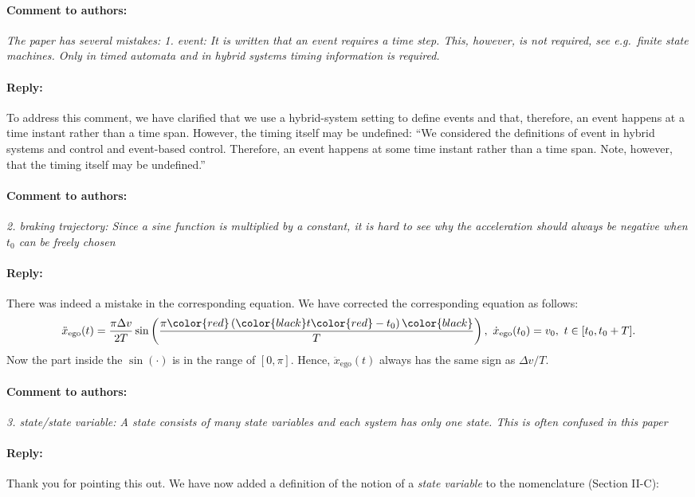 \documentclass[10pt,final,a4paper,oneside,onecolumn]{article}
\newcommand{\toauthor}{\paragraph*{Comment to authors:} \itshape}
\newcommand{\fromauthor}{\paragraph*{Reply:} \normalfont}
\newcommand{\cstart}{\cbstart\color{red}}
\newcommand{\cend}{\cbend\color{black}}
\newcommand{\amplitude}{\Delta v}
\newcommand{\duration}{T}
\newcommand{\east}{x}
\newcommand{\egosub}{ego}
\newcommand{\egospeed}{\dot{\east}_{\mathrm{\egosub}}}
\newcommand{\egospeedinitsymbol}{v}
\newcommand{\egospeedinit}{\egospeedinitsymbol_{0}}
\newcommand{\egoacceleration}{\ddot{\east}_{\mathrm{\egosub}}}
\renewcommand{\time}{t}
\newcommand{\inittime}{\time_{0}}
\begin{document}
\toauthor The paper has several mistakes: 1. event: It is written that an event requires a time step. This, however, is not required, see e.g.\ finite state machines. Only in timed automata and in hybrid systems timing information is required.

\fromauthor To address this comment, we have clarified that we use a hybrid-system setting to define events and that, therefore, an event happens at a time instant rather than a time span. However, the timing itself may be undefined: ``\cstart We considered the definitions of event in hybrid systems and control and event-based control. Therefore, an event happens at some time instant rather than a time span. Note, however, that the timing itself may be undefined.\cend''




\toauthor 2. braking trajectory: Since a sine function is multiplied by a constant, it is hard to see why the acceleration should always be negative when $t_0$ can be freely chosen

\fromauthor There was indeed a mistake in the corresponding equation. We have corrected the corresponding equation as follows:
\begin{equation}
\egoacceleration(\time) = \frac{\pi \amplitude}{2\duration} \sin \left( \frac{\pi \color{red}\left(\color{black} \time \color{red} - \inittime\right)\color{black}}{\duration} \right),\ \egospeed(\inittime) = \egospeedinit,\ \time \in [\inittime, \inittime+\duration].
\end{equation}
Now the part inside the $\sin(\cdot)$ is in the range of $[0, \pi]$. Hence, $\egoacceleration(\time)$ always has the same sign as $\amplitude/\duration$.



\toauthor 3. state/state variable: A state consists of many state variables and each system has only one state. This is often confused in this paper

\fromauthor Thank you for pointing this out. We have now added a definition of the notion of a \emph{state variable} to the nomenclature (Section II-C):
\end{document}
